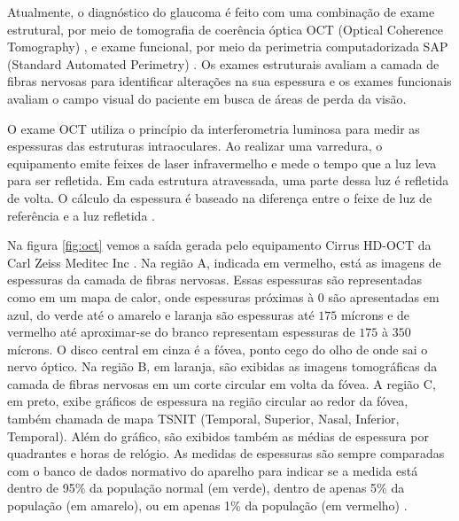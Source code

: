 \documentclass[conference]{IEEEtran}
\begin{document}

Atualmente, o diagnóstico do glaucoma é feito com uma combinação de exame estrutural, por meio de tomografia de coerência óptica OCT (Optical Coherence Tomography) \cite{Wollstein2005}, e exame funcional, por meio da perimetria computadorizada SAP (Standard Automated Perimetry) \cite{chauhan1990}. Os exames estruturais avaliam a camada de fibras nervosas para identificar alterações na sua espessura e os exames funcionais avaliam o campo visual do paciente em busca de áreas de perda da visão. 

O exame OCT utiliza o princípio da interferometria luminosa para medir as espessuras das estruturas intraoculares. Ao realizar uma varredura, o equipamento emite feixes de laser infravermelho e mede o tempo que a luz leva para ser refletida. Em cada estrutura atravessada, uma parte dessa luz é refletida de volta. O cálculo da espessura é baseado na diferença entre o feixe de luz de referência e a luz refletida \cite{huang1991}. 

Na figura \ref{fig:oct} vemos a saída gerada pelo equipamento Cirrus HD-OCT da Carl Zeiss Meditec Inc \cite{zeiss}. Na região A, indicada em vermelho, está as imagens de espessuras da camada de fibras nervosas. Essas espessuras são representadas como em um mapa de calor, onde espessuras próximas à $0$ são apresentadas em azul, do verde até o amarelo e laranja são espessuras até $175$ mícrons e de vermelho até aproximar-se do branco representam espessuras de $175$ à $350$ mícrons. O disco central em cinza é a fóvea, ponto cego do olho de onde sai o nervo óptico. Na região B, em laranja, são exibidas as imagens tomográficas da camada de fibras nervosas em um corte circular em volta da fóvea. A região C, em preto, exibe gráficos de espessura na região circular ao redor da fóvea, também chamada de mapa TSNIT (Temporal, Superior, Nasal, Inferior, Temporal). Além do gráfico, são exibidos também as médias de espessura por quadrantes e horas de relógio. As medidas de espessuras são sempre comparadas com o banco de dados normativo do aparelho para indicar se a medida está dentro de 95\% da população normal (em verde), dentro de apenas 5\% da população (em amarelo), ou em apenas 1\% da população (em vermelho) \cite{aref2010}. 
\end{document}
